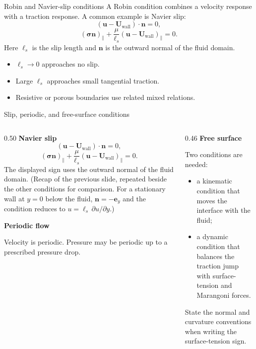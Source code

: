 \documentclass[aspectratio=169,11pt]{beamer}
\newcommand{\uvec}{\bm{u}}
\newcommand{\nvec}{\bm{n}}
\newcommand{\stress}{\bm{\sigma}}
\begin{document}
\begin{frame}{Robin and Navier-slip conditions}
A Robin condition combines a velocity response with a traction response. A common example is Navier slip:
\[
  (\uvec-\mathbf U_{\mathrm{wall}})\cdot\nvec=0,
\]
\[
  (\stress\nvec)_{\parallel}
  +\frac{\mu}{\ell_s}
  (\uvec-\mathbf U_{\mathrm{wall}})_{\parallel}=0.
\]
Here $\ell_s$ is the slip length and $\nvec$ is the outward normal of the fluid domain.

\begin{itemize}\itemsep5pt
  \item $\ell_s\to0$ approaches no slip.
  \item Large $\ell_s$ approaches small tangential traction.
  \item Resistive or porous boundaries use related mixed relations.
\end{itemize}
\end{frame}

\begin{frame}{Slip, periodic, and free-surface conditions}
\begin{columns}[T,onlytextwidth]
\begin{column}{0.50\textwidth}
\textbf{Navier slip}
\[
  (\uvec-\mathbf{U}_{\mathrm{wall}})\cdot\nvec=0,
\]
\[
  (\stress\nvec)_{\parallel}
  +\frac{\mu}{\ell_s}
  (\uvec-\mathbf{U}_{\mathrm{wall}})_{\parallel}=0.
\]
The displayed sign uses the outward normal of the fluid domain.
{\scriptsize (Recap of the previous slide, repeated beside the other conditions for comparison. For a stationary wall at $y=0$ below the fluid, $\nvec=-\bm e_y$ and the condition reduces to $u=\ell_s\,\partial u/\partial y$.)}

\medskip
\textbf{Periodic flow}

Velocity is periodic. Pressure may be periodic up to a prescribed pressure drop.
\end{column}
\begin{column}{0.46\textwidth}
\textbf{Free surface}

Two conditions are needed:
\begin{itemize}\itemsep5pt
  \item a kinematic condition that moves the interface with the fluid;
  \item a dynamic condition that balances the traction jump with surface-tension and Marangoni forces.
\end{itemize}
\begin{punchbox}
\small State the normal and curvature conventions when writing the surface-tension sign.
\end{punchbox}
\end{column}
\end{columns}
\end{frame}
\end{document}
